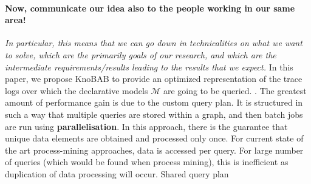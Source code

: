 \paragraph*{Now, communicate our idea also to the people working in our same area!} \textit{In particular, this means that we can go down in technicalities on what we want to solve, which are the primarily goals of our research, and which are the intermediate requirements/results leading to the results that we expect.} 
In this paper, we propose KnoBAB to provide an optimized representation of the trace logs over which the declarative models $\mathcal{M}$ are going to be queried. 
.  The greatest amount of performance gain is due to the custom query plan. It is structured in such a way that multiple queries are stored within a graph, and then batch jobs are run using \textbf{parallelisation}. In this approach, there is the guarantee that unique data elements are obtained and processed only once. For current state of the art process-mining approaches, data is accessed per query. For large number of queries (which would be found when process mining), this is inefficient as duplication of data processing will occur. Shared query plan \cite{BellatrecheKB21}

